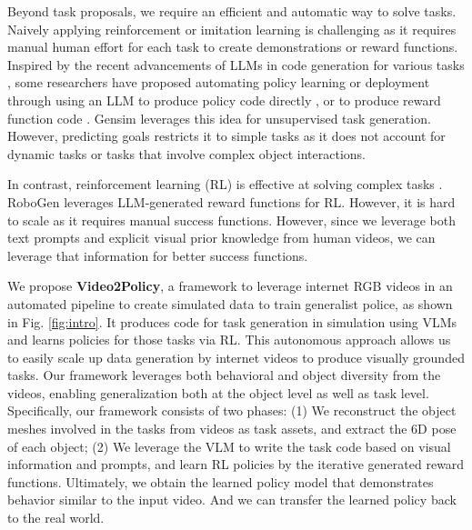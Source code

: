 Beyond task proposals, we require an efficient and automatic way to solve tasks. Naively applying reinforcement or imitation learning is challenging as it requires manual human effort for each task to create demonstrations or reward functions. Inspired by the recent advancements of LLMs in code generation for various tasks \citep{achiam2023gpt, roziere2023code}, some researchers have proposed automating policy learning or deployment through using an LLM 
to produce policy code directly \citep{huang2023voxposer, liang2023code, wang2023gensim}, or to produce reward function code \citep{ma2023eureka, wang2023robogen}. 
Gensim \citep{wang2023gensim} leverages this idea for unsupervised task generation. 
However, predicting goals restricts it to simple tasks as it does not account for dynamic tasks or tasks that involve complex object interactions. 

In contrast, reinforcement learning (RL) is effective at solving complex tasks \citep{schulman2017proximal, ye2021mastering, hafner2023mastering, wang2024efficientzero, springenberg2024offline}. 
RoboGen \citep{wang2023robogen} leverages LLM-generated reward functions for RL. However, it is hard to scale as it requires manual success functions. However, since we leverage both text prompts and explicit visual prior knowledge from human videos, we can leverage that information for better success functions.

We propose \textbf{Video2Policy}, a framework to leverage internet RGB videos in an automated pipeline to create simulated data to train generalist police, as shown in Fig. \ref{fig:intro}. It produces code for task generation in simulation using VLMs and learns policies for those tasks via RL. This autonomous approach allows us to easily scale up data generation by internet videos to produce visually grounded tasks. Our framework leverages both behavioral and object diversity from the videos, enabling generalization both at the object level as well as task level. 
Specifically, our framework consists of two phases: (1) We reconstruct the object meshes involved in the tasks from videos as task assets, and extract the 6D pose of each object; (2) We leverage the VLM to write the task code based on visual information and prompts, and learn RL policies by the iterative generated reward functions. 
Ultimately, we obtain the learned policy model that demonstrates behavior similar to the input video. And we can transfer the learned policy back to the real world.

